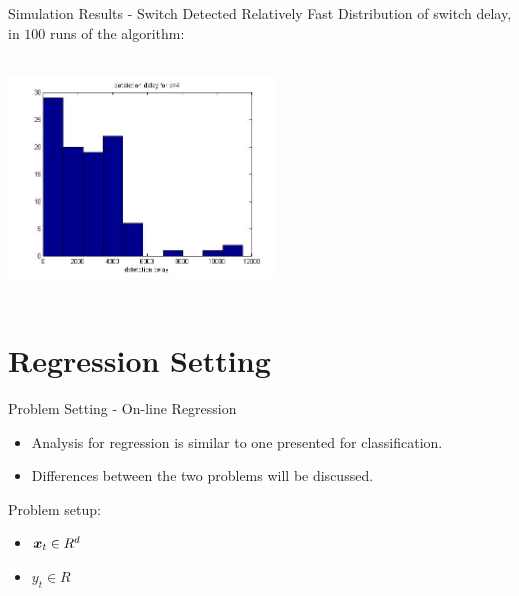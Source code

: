 \documentclass{beamer}
\begin{document}
\begin{frame}{Simulation Results - Switch Detected Relatively Fast}
Distribution of switch delay, in $100$ runs of the algorithm:
\begin{center}
\includegraphics[height=2.5in,width=2.8in]{delay_clas.jpg}
\end{center}
\end{frame}

\section{Regression Setting}
\begin{frame}{Problem Setting - On-line Regression}
\begin{itemize}
\item Analysis for regression is similar to one presented for classification.\newline
\item  Differences between the two problems will be discussed.\newline
\end{itemize}

Problem setup:

\begin{itemize}
\item ${\boldsymbol{x}}_{t}\in R^d$
\item $y_t\in R$
\end{itemize}

\end{frame}
\end{document}
